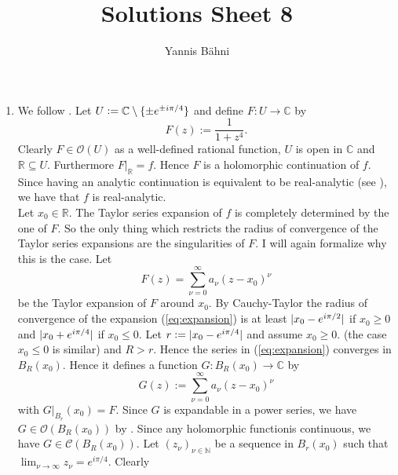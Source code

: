 

\title{Solutions Sheet 8}
\author{Yannis B\"{a}hni}
\address[Yannis B\"{a}hni]{University of Zurich, R\"{a}mistrasse 71, 8006 Zurich}


\maketitle
\thispagestyle{fancy}
\begin{enumerate}[label = \textbf{Exercise \arabic*.},wide = 0pt, itemsep=1.5ex]
	\item We follow \cite[99--101]{fischer2003funktionentheorie}. Let $U := \mathbb{C} \setminus \cbr[0]{\pm e^{\pm i\pi/4}}$ and define $F: U \to \mathbb{C}$ by
		\begin{equation}
			F(z) := \frac{1}{1 + z^4}.	
		\end{equation}
		Clearly $F \in \mathcal{O}(U)$ as a well-defined rational function, $U$ is open in $\mathbb{C}$ and $\mathbb{R} \subseteq U$. Furthermore $F\vert_\mathbb{R} = f$. Hence $F$ is a holomorphic continuation of $f$. Since having an analytic continuation is equivalent to be real-analytic (see \cite[100]{fischer2003funktionentheorie}), we have that $f$ is real-analytic.\\
		Let $x_0 \in \mathbb{R}$. The Taylor series expansion of $f$ is completely determined by the one of $F$. So the only thing which restricts the radius of convergence of the Taylor series expansions are the singularities of $F$. I will again formalize why this is the case. Let 
		\begin{equation}
			F(z) = \sum_{\nu = 0}^\infty a_\nu(z - x_0)^\nu
			\label{eq:expansion}
		\end{equation}
		\noindent be the Taylor expansion of $F$ around $x_0$. By Cauchy-Taylor the radius of convergence of the expansion (\ref{eq:expansion}) is at least $\abs[0]{x_0 - e^{i\pi/2}}$ if $x_0 \geq 0$ and $\abs[0]{x_0 + e^{i\pi/4}}$ if $x_0 \leq 0$. Let $r:= \abs[0]{x_0 - e^{i\pi/4}}$ and assume $x_0 \geq 0$. (the case $x_0 \leq 0$ is similar) and $R > r$. Hence the series in (\ref{eq:expansion}) converges in $B_R(x_0)$. Hence it defines a function $G: B_R(x_0) \to \mathbb{C}$ by
		\begin{equation}
			G(z) := \sum_{\nu = 0}^\infty a_\nu(z - x_0)^\nu 
		\end{equation}
		\noindent with $G\vert_{B_r}(x_0) = F$. Since $G$ is expandable in a power series, we have $G \in \mathcal{O}(B_R(x_0))$ by \cite[187]{remmert2002funktionentheorie}. Since any holomorphic functionis continuous, we have $G \in \mathscr{C}(B_R(x_0))$. Let $(z_\nu)_{\nu \in \mathbb{N}}$ be a sequence in $B_r(x_0)$ such that $\lim_{\nu \to \infty} z_\nu = e^{i\pi/4}$. Clearly

\end{enumerate}
